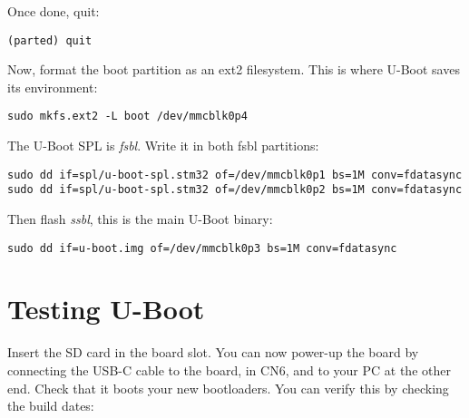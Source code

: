 Once done, quit:
\begin{verbatim}
(parted) quit
\end{verbatim}


Now, format the boot partition as an ext2 filesystem. This is where
U-Boot saves its environment:
\begin{verbatim}
sudo mkfs.ext2 -L boot /dev/mmcblk0p4
\end{verbatim}

The U-Boot SPL is {\em fsbl}. Write it in both fsbl partitions:

\begin{verbatim}
sudo dd if=spl/u-boot-spl.stm32 of=/dev/mmcblk0p1 bs=1M conv=fdatasync
sudo dd if=spl/u-boot-spl.stm32 of=/dev/mmcblk0p2 bs=1M conv=fdatasync
\end{verbatim}

Then flash {\em ssbl}, this is the main U-Boot binary:

\begin{verbatim}
sudo dd if=u-boot.img of=/dev/mmcblk0p3 bs=1M conv=fdatasync
\end{verbatim}

\section{Testing U-Boot}

Insert the SD card in the board slot. You can now power-up the board
by connecting the USB-C cable to the board, in CN6,  and
to your PC at the other end. Check that it boots your new bootloaders.
You can verify this by checking the build dates:

